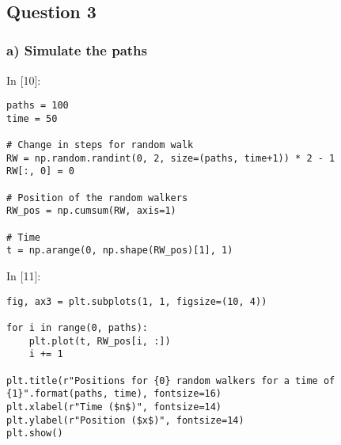 \documentclass[11pt]{article}
\newif\ifcode
\newif\ifleftmargins
\newlength{\promptlength}
\newcommand{\prompt}[3]{
        \needspace{1.1cm}
        \settowidth{\promptlength}{ #1 [#3] }
        \ifleftmargins\hspace{-\promptlength}\hspace{-5pt}\fi
        {\color{#2}#1 [#3]:}
        \ifleftmargins\vspace{-2.7ex}\fi
    }
\begin{document}
    \begin{center}
    \end{center}
    { \hspace*{\fill} \\}
    
    \hypertarget{question-3}{%
\subsection{Question 3}\label{question-3}}

    \hypertarget{a-simulate-the-paths}{%
\subsubsection{a) Simulate the paths}\label{a-simulate-the-paths}}

    
\prompt{In}{incolor}{10}
\codetrue
\begin{tcolorbox}[breakable, size=fbox, boxrule=1pt, pad at break*=1mm, colback=cellbackground, colframe=cellborder]
\begin{verbatim}
paths = 100
time = 50

# Change in steps for random walk
RW = np.random.randint(0, 2, size=(paths, time+1)) * 2 - 1
RW[:, 0] = 0

# Position of the random walkers
RW_pos = np.cumsum(RW, axis=1)

# Time
t = np.arange(0, np.shape(RW_pos)[1], 1)
\end{verbatim}
\end{tcolorbox}
\codefalse

    
\prompt{In}{incolor}{11}
\codetrue
\begin{tcolorbox}[breakable, size=fbox, boxrule=1pt, pad at break*=1mm, colback=cellbackground, colframe=cellborder]
\begin{verbatim}
fig, ax3 = plt.subplots(1, 1, figsize=(10, 4))

for i in range(0, paths):
    plt.plot(t, RW_pos[i, :])
    i += 1

plt.title(r"Positions for {0} random walkers for a time of {1}".format(paths, time), fontsize=16)    
plt.xlabel(r"Time ($n$)", fontsize=14)
plt.ylabel(r"Position ($x$)", fontsize=14)
plt.show()
\end{verbatim}
\end{tcolorbox}
\codefalse

    \begin{center}
    \end{center}
    { \hspace*{\fill} \\}
    
\end{document}
